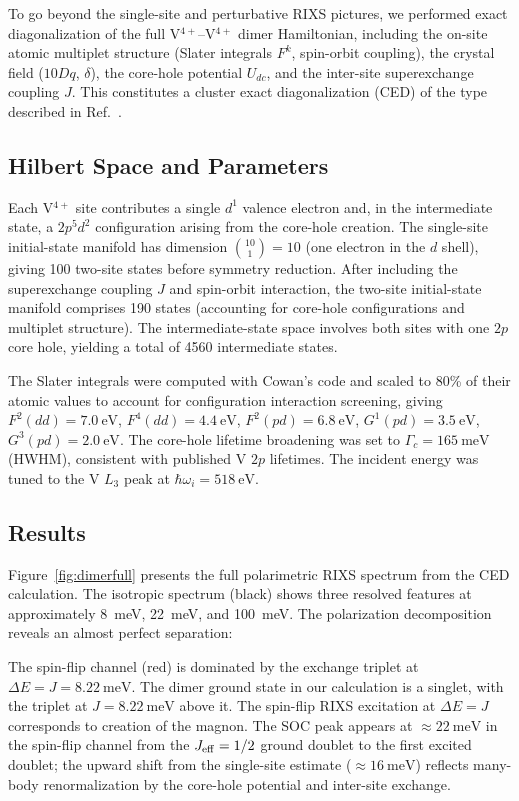 \documentclass[aps,prb,twocolumn,superscriptaddress,longbibliography]{revtex4-2}
\begin{document}
To go beyond the single-site and perturbative RIXS pictures, we performed
exact diagonalization of the full V$^{4+}$--V$^{4+}$ dimer Hamiltonian,
including the on-site atomic multiplet structure (Slater integrals $F^k$,
spin-orbit coupling), the crystal field ($10Dq$, $\delta$), the core-hole
potential $U_{dc}$, and the inter-site superexchange coupling $J$.
This constitutes a cluster exact diagonalization (CED) of the type described
in Ref.~\cite{Wang2019}.

\subsection{Hilbert Space and Parameters}

Each V$^{4+}$ site contributes a single $d^1$ valence electron and, in the
intermediate state, a $2p^5 d^2$ configuration arising from the core-hole
creation.
The single-site initial-state manifold has dimension
$\binom{10}{1} = 10$ (one electron in the $d$ shell), giving 100 two-site
states before symmetry reduction.
After including the superexchange coupling $J$ and spin-orbit interaction,
the two-site initial-state manifold comprises 190 states (accounting for
core-hole configurations and multiplet structure).
The intermediate-state space involves both sites with one $2p$ core hole,
yielding a total of 4560 intermediate states.

The Slater integrals were computed with Cowan's code and scaled to 80\% of
their atomic values to account for configuration interaction screening,
giving $F^2(dd) = \SI{7.0}{\eV}$, $F^4(dd) = \SI{4.4}{\eV}$,
$F^2(pd) = \SI{6.8}{\eV}$, $G^1(pd) = \SI{3.5}{\eV}$, $G^3(pd) = \SI{2.0}{\eV}$.
The core-hole lifetime broadening was set to $\Gamma_c = \SI{165}{\milli\eV}$
(HWHM), consistent with published V $2p$ lifetimes.
The incident energy was tuned to the V $L_3$ peak at $\hbar\omega_i = \SI{518}{\eV}$.

\subsection{Results}

Figure~\ref{fig:dimerfull} presents the full polarimetric RIXS spectrum from
the CED calculation.
The isotropic spectrum (black) shows three resolved features at approximately
\SI{8}{\milli\eV}, \SI{22}{\milli\eV}, and \SI{100}{\milli\eV}.
The polarization decomposition reveals an almost perfect separation:

The spin-flip channel (red) is dominated by the exchange triplet at
$\Delta E = J = \SI{8.22}{\milli\eV}$.
The dimer ground state in our calculation is a singlet, with the
triplet at $J = \SI{8.22}{\milli\eV}$ above it.
The spin-flip RIXS excitation at $\Delta E = J$ corresponds to
creation of the magnon.
The SOC peak appears at $\approx \SI{22}{\milli\eV}$ in the spin-flip channel
from the $J_{\rm eff} = 1/2$ ground doublet to the first excited doublet;
the upward shift from the single-site estimate ($\approx\SI{16}{\milli\eV}$)
reflects many-body renormalization by the core-hole potential and inter-site
exchange.
\end{document}
